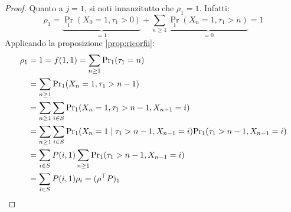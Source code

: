 \begin{proof}
	Quanto a $j=1$, si noti innanzitutto che $\rho_1=1$. Infatti:
	\begin{equation*}
		\rho_1 = \underbrace{\Pr_1(X_0=1,\tau_1>0)}_{=1} + \sum_{n\ge1} \underbrace{\Pr_1(X_n=1,\tau_1>n)}_{=0} = 1
	\end{equation*}
	Applicando la proposizione \ref{prop:ricorfii}:
	\begin{align*}
		\rho_1 & = 1 = f(1,1) = \sum_{n\ge1} \mathrm{Pr}_1(\tau_1=n)                                                  \\
		       & = \sum_{n\ge1} \mathrm{Pr}_1(X_n=1,\tau_1>n-1)                                                       \\
		       & = \sum_{n\ge1} \sum_{i\in S} \mathrm{Pr}_1(X_n=1,\tau_1>n-1,X_{n-1}=i)                               \\
		       & = \sum_{n\ge1} \sum_{i\in S} \mathrm{Pr}_1(X_n=1\mid\tau_1>n-1,X_{n-1}=i)\mathrm{Pr}_1(\tau_1>n-1,X_{n-1}=i) \\
		       & = \sum_{i\in S} P(i,1) \sum_{n\ge1} \mathrm{Pr}_1(\tau_1>n-1,X_{n-1}=i)                              \\
		       & = \sum_{i\in S} P(i,1) \rho_i = (\rho^\top P)_1 \qedhere
	\end{align*}
\end{proof}
